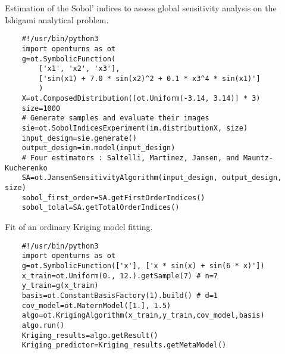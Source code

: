 \begin{otexample_apx}
    Estimation of the Sobol' indices to assess global sensitivity analysis on the Ishigami analytical problem. 
    \lstset{style=mystyle, language=python}
%
\begin{lstlisting}
    #!/usr/bin/python3
    import openturns as ot
    g=ot.SymbolicFunction(
        ['x1', 'x2', 'x3'], 
        ['sin(x1) + 7.0 * sin(x2)^2 + 0.1 * x3^4 * sin(x1)']
        )
    X=ot.ComposedDistribution([ot.Uniform(-3.14, 3.14)] * 3)
    size=1000
    # Generate samples and evaluate their images
    sie=ot.SobolIndicesExperiment(im.distributionX, size)
    input_design=sie.generate()
    output_design=im.model(input_design)
    # Four estimators : Saltelli, Martinez, Jansen, and Mauntz-Kucherenko
    SA=ot.JansenSensitivityAlgorithm(input_design, output_design, size)
    sobol_first_order=SA.getFirstOrderIndices()
    sobol_tolal=SA.getTotalOrderIndices()
\end{lstlisting}
%
\end{otexample_apx}



\begin{otexample_apx}
    Fit of an ordinary Kriging model fitting. 
    \lstset{style=mystyle, language=python}
%
\begin{lstlisting}
    #!/usr/bin/python3
    import openturns as ot
    g=ot.SymbolicFunction(['x'], ['x * sin(x) + sin(6 * x)'])
    x_train=ot.Uniform(0., 12.).getSample(7) # n=7
    y_train=g(x_train)
    basis=ot.ConstantBasisFactory(1).build() # d=1
    cov_model=ot.MaternModel([1.], 1.5)
    algo=ot.KrigingAlgorithm(x_train,y_train,cov_model,basis)
    algo.run()
    Kriging_results=algo.getResult()
    Kriging_predictor=Kriging_results.getMetaModel()
\end{lstlisting}
%
\end{otexample_apx}
